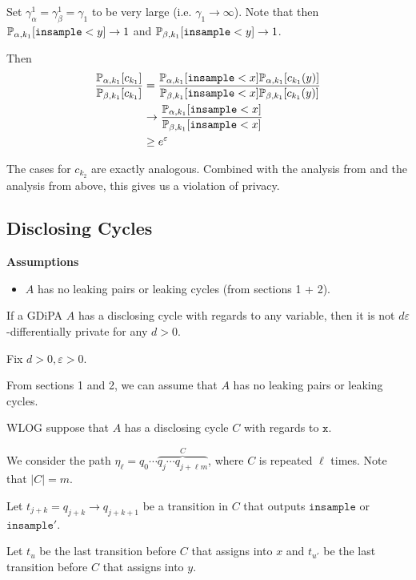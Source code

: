Set $\gamma_\alpha^1= \gamma_\beta^1=\gamma_1$ to be very large (i.e. $\gamma_1\to\infty$). Note that then $\PP_{\alpha, k_1}[\lguard[y]]\to 1$ and $\PP_{\beta, k_1}[\lguard[y]]\to 1$.

Then \begin{align*}
    \frac{\PP_{\alpha, k_1}[c_{k_1}]}{\PP_{\beta, k_1}[c_{k_1}]} &= \frac{\PP_{\alpha, k_1}[\lguard[x]]\PP_{\alpha, k_1}[c_{k_1}(y)]}{\PP_{\beta, k_1}[\lguard[x]]\PP_{\beta, k_1}[c_{k_1}(y)]}\\
	&\to  \frac{\PP_{\alpha, k_1}[\lguard[x]]}{\PP_{\beta, k_1}[\lguard[x]]}\\
	&\geq e^\varepsilon
\end{align*}

The cases for $c_{k_2}$ are exactly analogous. Combined with the analysis from \cite{chadhaLinearTimeDecidability2021} and the analysis from above, this gives us a violation of privacy. 

\subsection{Disclosing Cycles}

\textbf{Assumptions}
\begin{itemize}
	\item $A$ has no leaking pairs or leaking cycles (from sections 1 + 2).
\end{itemize}

\begin{thm}
	If a GDiPA $A$ has a disclosing cycle with regards to any variable, then it is not $d\varepsilon$-differentially private for any $d>0$. 
\end{thm}

Fix $d>0, \varepsilon>0$. 

From sections 1 and 2, we can assume that $A$ has no leaking pairs or leaking cycles. 

WLOG suppose that $A$ has a disclosing cycle $C$ with regards to $\texttt{x}$. 

We consider the path $\eta_\ell = q_0\cdots \overbrace{q_j\cdots q_{j+\ell m}}^{C}$, where $C$ is repeated $\ell$ times. Note that $|C| = m$. 

Let $t_{j+k} = q_{j+k}\to q_{j+k+1}$ be a transition in $C$ that outputs $\texttt{insample}$ or $\texttt{insample}'$.

Let $t_{u}$ be the last transition before $C$ that assigns into $x$ and $t_{u'}$ be the last transition before $C$ that assigns into $y$. 

